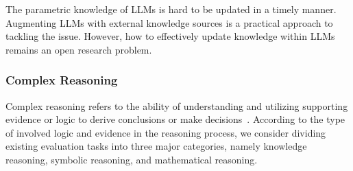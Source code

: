\begin{center}
\begin{tcolorbox}[colback=blue!5!white,colframe=blue!55!black,width=0.46\textwidth,title={Knowledge Recency}]
The parametric knowledge of LLMs is hard to be updated in a timely manner.
Augmenting LLMs with external knowledge sources is a practical approach to tackling the issue.
However, how to effectively update knowledge within LLMs remains an open research problem.
\end{tcolorbox}
\end{center}

\subsubsection{Complex Reasoning} 

Complex reasoning refers to the ability of understanding and utilizing supporting evidence or logic to derive conclusions or make decisions~\cite{Huang-arxiv-2022-Towards,Qiao-arxiv-2022-Reasoning}. 
According to the type of involved  logic and evidence in the reasoning process, 
we consider dividing existing evaluation tasks into three major categories, namely 
knowledge reasoning, symbolic reasoning, and mathematical reasoning. 


